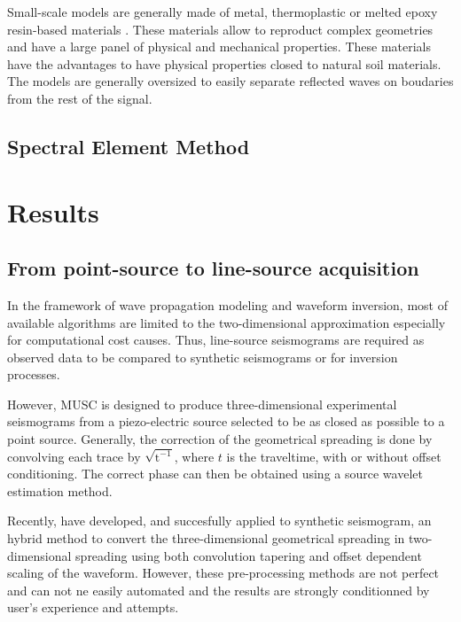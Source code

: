 \documentclass[manuscript,revised]{geophysics}
\begin{document}
\noindent Small-scale models are generally made of metal, thermoplastic or melted epoxy resin-based materials \citep{Bretaudeau_FWI_2013,Bretaudeau_SSM_2011,Bretaudeau_SSA_2008b}. These materials allow to reproduct complex geometries and have a large panel of physical and mechanical properties. These materials have the advantages to have physical properties closed to natural soil materials. The models are generally oversized to easily separate reflected waves on boudaries from the rest of the signal. 

\subsection{Spectral Element Method}




\section{Results}

\subsection{From point-source to line-source acquisition}

\noindent In the framework of wave propagation modeling and waveform inversion, most of available algorithms are limited to the two-dimensional approximation especially for computational cost causes. Thus, line-source seismograms are required as observed data to be compared to synthetic seismograms or for inversion processes.

\noindent However, MUSC is designed to produce three-dimensional experimental seismograms from a piezo-electric source selected to be as closed as possible to a point source. Generally, the correction of the geometrical spreading is done by convolving each trace by $\mathrm{\sqrt{t^{-1}}}$, where $t$ is the traveltime, with or without offset conditioning. The correct phase can then be obtained using a source wavelet estimation method.

\noindent Recently, \citet{Schafer_LSS_2014} have developed, and succesfully applied to synthetic seismogram, an hybrid method to convert the three-dimensional geometrical spreading in two-dimensional spreading using both convolution tapering and offset dependent scaling of the waveform. However, these pre-processing methods are not perfect and can not ne easily automated and the results are strongly conditionned by user's experience and attempts.
\end{document}
